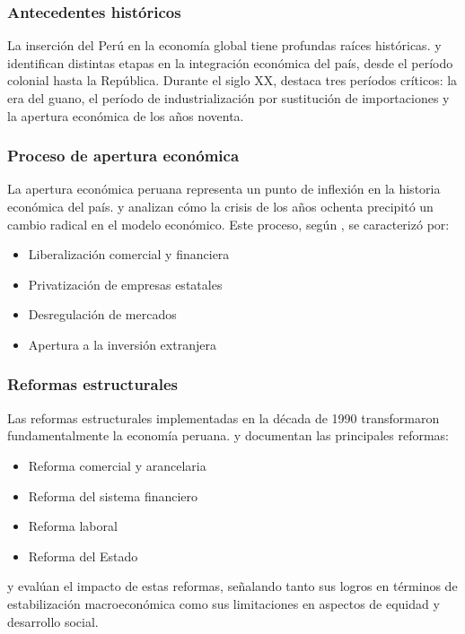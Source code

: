\documentclass[12pt, a4paper]{article}
\begin{document}
\subsubsection{Antecedentes históricos}
La inserción del Perú en la economía global tiene profundas raíces históricas. \textcite{thorp2012} y \textcite{bulmer1998} identifican distintas etapas en la integración económica del país, desde el período colonial hasta la República. Durante el siglo XX, \textcite{sheahan2001} destaca tres períodos críticos: la era del guano, el período de industrialización por sustitución de importaciones y la apertura económica de los años noventa.

\subsubsection{Proceso de apertura económica}
La apertura económica peruana representa un punto de inflexión en la historia económica del país. \textcite{wise2003} y \textcite{pasco2009} analizan cómo la crisis de los años ochenta precipitó un cambio radical en el modelo económico. Este proceso, según \textcite{gonzales2015}, se caracterizó por:
\begin{itemize}
    \item Liberalización comercial y financiera
    \item Privatización de empresas estatales
    \item Desregulación de mercados
    \item Apertura a la inversión extranjera
\end{itemize}

\subsubsection{Reformas estructurales}
Las reformas estructurales implementadas en la década de 1990 transformaron fundamentalmente la economía peruana. \textcite{abusada2000} y \textcite{parodi2014} documentan las principales reformas:
\begin{itemize}
    \item Reforma comercial y arancelaria
    \item Reforma del sistema financiero
    \item Reforma laboral
    \item Reforma del Estado
\end{itemize}

\textcite{franco2018} y \textcite{vega2019} evalúan el impacto de estas reformas, señalando tanto sus logros en términos de estabilización macroeconómica como sus limitaciones en aspectos de equidad y desarrollo social.
\end{document}

